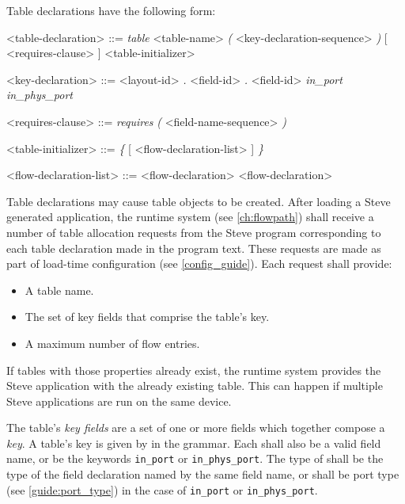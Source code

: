 Table declarations have the following form:

\begin{minip}
\begin{grammar}
<table-declaration> ::=
\textit{table} <table-name> \textit{(} <key-declaration-sequence> \textit{)}
[ <requires-clause> ] <table-initializer>

<key-declaration> ::=
<layout-id> \textit{.} <field-id>
 \textit{.} <field-id>
\alt \textit{in\_port}
\alt \textit{in\_phys\_port}

<requires-clause> ::=
\textit{requires} \textit{(} <field-name-sequence> \textit{)}

<table-initializer> ::= \textit{\{} [ <flow-declaration-list> ] \textit{\}}

<flow-declaration-list> ::= <flow-declaration>
 <flow-declaration>
\end{grammar}
\end{minip}

Table declarations may cause table objects to be created. After loading a Steve generated application, the runtime system (see \ref{ch:flowpath}) shall receive a number of table allocation requests from the Steve program corresponding to each table declaration made in the program text. These requests are made as part of load-time configuration (see \ref{config_guide}). Each request shall provide:

\begin{itemize}
\item A table name.
\item The set of key fields that comprise the table's key.
\item A maximum number of flow entries.
\end{itemize}

If tables with those properties already exist, the runtime system provides the Steve application with the already existing table. This can happen if multiple Steve applications are run on the same device.

The table's \textit{key fields} are a set of one or more fields which together compose a \textit{key}. A table's key is given by  in the grammar. Each  shall also be a valid field name, or be the keywords \texttt{in\_port} or \texttt{in\_phys\_port}. The type of  shall be the type of the field declaration named by the same field name, or shall be port type (see \ref{guide:port_type}) in the case of \texttt{in\_port} or \texttt{in\_phys\_port}.

